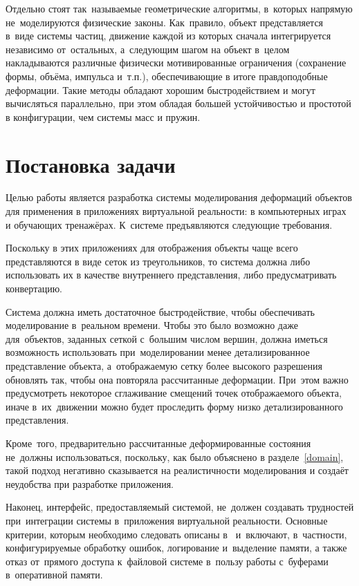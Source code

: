 \documentclass[a4paper,11pt]{report}
\begin{document}
    Отдельно стоят так~называемые геометрические алгоритмы, в~которых напрямую не~моделируются
    физические законы. Как~правило, объект представляется в~виде системы частиц, движение каждой из
    которых сначала интегрируется независимо от~остальных, а~следующим шагом на объект в~целом
    накладываются различные физически мотивированные ограничения (сохранение формы, объёма, импульса
    и~т.п.), обеспечивающие в итоге правдоподобные деформации. Такие методы обладают хорошим
    быстродействием и могут вычисляться параллельно, при этом обладая большей устойчивостью и
    простотой в конфигурации, чем системы масс и пружин.

  \chapter{Постановка задачи}

    Целью работы является разработка системы моделирования деформаций объектов для применения в
    приложениях виртуальной реальности: в компьютерных играх и обучающих тренажёрах.
    К~системе предъявляются следующие требования.

    Поскольку в этих приложениях для отображения объекты чаще всего представляются в виде сеток
    из треугольников, то система должна либо использовать их в качестве внутреннего представления, либо
    предусматривать конвертацию.

    Система должна иметь достаточное быстродействие, чтобы обеспечивать моделирование в~реальном
    времени. Чтобы это было возможно даже для~объектов, заданных сеткой с~большим числом вершин,
    должна иметься возможность использовать при~моделировании менее детализированное представление
    объекта, а~отображаемую сетку более высокого разрешения обновлять так, чтобы она повторяла
    рассчитанные деформации. При~этом важно предусмотреть некоторое сглаживание смещений точек
    отображаемого объекта, иначе в~их~движении можно будет проследить форму низко детализированного
    представления.

    Кроме~того, предварительно рассчитанные деформированные состояния не~должны использоваться,
    поскольку, как было объяснено в разделе~\ref{domain}, такой подход негативно сказывается на реалистичности
    моделирования и создаёт неудобства при разработке приложения.

    Наконец, интерфейс, предоставляемый системой, не~должен создавать трудностей при~интеграции
    системы в~приложения виртуальной реальности. Основные критерии, которым необходимо следовать
    описаны в~\cite{gems-middleware} и~включают, в~частности, конфигурируемые обработку ошибок,
    логирование и~выделение памяти, а также отказ от~прямого доступа к~файловой системе в~пользу
    работы с~буферами в~оперативной памяти.
\end{document}
